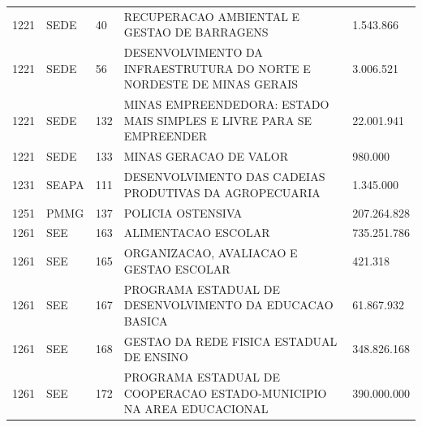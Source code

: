 \documentclass{article}
\begin{document}
\begin{longtable}[c]{m{1cm}|m{1.5cm}|m{1cm}m{10cm}|m{2cm}}
\multicolumn{1}{C{1cm}|}{1221} & \multicolumn{1}{L{1.5cm}|}{SEDE} & \multicolumn{1}{C{1cm}|}{40} & \multicolumn{1}{L{10cm}|}{RECUPERACAO AMBIENTAL E GESTAO DE BARRAGENS} & \multicolumn{1}{R{2cm}}{1.543.866} \\
\multicolumn{1}{C{1cm}|}{1221} & \multicolumn{1}{L{1.5cm}|}{SEDE} & \multicolumn{1}{C{1cm}|}{56} & \multicolumn{1}{L{10cm}|}{DESENVOLVIMENTO DA INFRAESTRUTURA DO NORTE E NORDESTE DE MINAS GERAIS} & \multicolumn{1}{R{2cm}}{3.006.521} \\
\multicolumn{1}{C{1cm}|}{1221} & \multicolumn{1}{L{1.5cm}|}{SEDE} & \multicolumn{1}{C{1cm}|}{132} & \multicolumn{1}{L{10cm}|}{MINAS EMPREENDEDORA: ESTADO MAIS SIMPLES E LIVRE PARA SE EMPREENDER} & \multicolumn{1}{R{2cm}}{22.001.941} \\
\multicolumn{1}{C{1cm}|}{1221} & \multicolumn{1}{L{1.5cm}|}{SEDE} & \multicolumn{1}{C{1cm}|}{133} & \multicolumn{1}{L{10cm}|}{MINAS GERACAO DE VALOR} & \multicolumn{1}{R{2cm}}{980.000} \\
\multicolumn{1}{C{1cm}|}{1231} & \multicolumn{1}{L{1.5cm}|}{SEAPA} & \multicolumn{1}{C{1cm}|}{111} & \multicolumn{1}{L{10cm}|}{DESENVOLVIMENTO DAS CADEIAS PRODUTIVAS DA AGROPECUARIA} & \multicolumn{1}{R{2cm}}{1.345.000} \\
\multicolumn{1}{C{1cm}|}{1251} & \multicolumn{1}{L{1.5cm}|}{PMMG} & \multicolumn{1}{C{1cm}|}{137} & \multicolumn{1}{L{10cm}|}{POLICIA OSTENSIVA} & \multicolumn{1}{R{2cm}}{207.264.828} \\
\multicolumn{1}{C{1cm}|}{1261} & \multicolumn{1}{L{1.5cm}|}{SEE} & \multicolumn{1}{C{1cm}|}{163} & \multicolumn{1}{L{10cm}|}{ALIMENTACAO ESCOLAR} & \multicolumn{1}{R{2cm}}{735.251.786} \\
\multicolumn{1}{C{1cm}|}{1261} & \multicolumn{1}{L{1.5cm}|}{SEE} & \multicolumn{1}{C{1cm}|}{165} & \multicolumn{1}{L{10cm}|}{ORGANIZACAO, AVALIACAO E GESTAO ESCOLAR} & \multicolumn{1}{R{2cm}}{421.318} \\
\multicolumn{1}{C{1cm}|}{1261} & \multicolumn{1}{L{1.5cm}|}{SEE} & \multicolumn{1}{C{1cm}|}{167} & \multicolumn{1}{L{10cm}|}{PROGRAMA ESTADUAL DE DESENVOLVIMENTO DA EDUCACAO BASICA} & \multicolumn{1}{R{2cm}}{61.867.932} \\
\multicolumn{1}{C{1cm}|}{1261} & \multicolumn{1}{L{1.5cm}|}{SEE} & \multicolumn{1}{C{1cm}|}{168} & \multicolumn{1}{L{10cm}|}{GESTAO DA REDE FISICA ESTADUAL DE ENSINO} & \multicolumn{1}{R{2cm}}{348.826.168} \\
\multicolumn{1}{C{1cm}|}{1261} & \multicolumn{1}{L{1.5cm}|}{SEE} & \multicolumn{1}{C{1cm}|}{172} & \multicolumn{1}{L{10cm}|}{PROGRAMA ESTADUAL DE COOPERACAO ESTADO-MUNICIPIO NA AREA EDUCACIONAL} & \multicolumn{1}{R{2cm}}{390.000.000} \\

\end{longtable}
\end{document}
